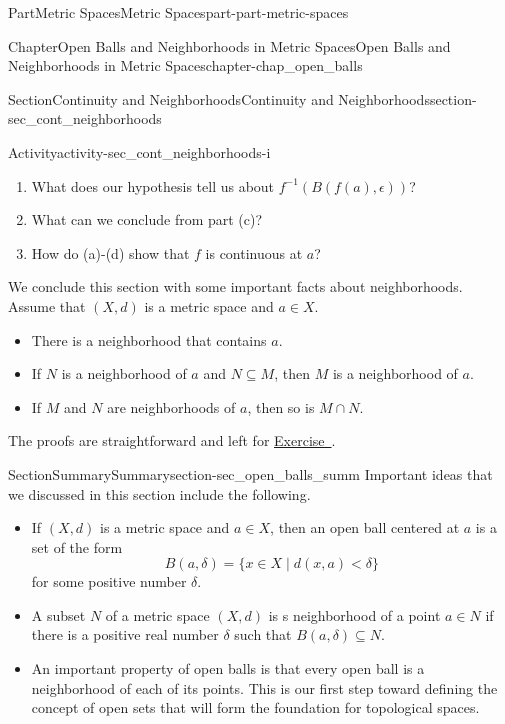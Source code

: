 \documentclass[oneside,10pt,]{book}
\newcommand{\xreffont}{\relax}
\numberwithin{equation}{chapter}
\newcommand{\lt}{<}
\begin{document}
\begin{partptx}{Part}{Metric Spaces}{}{Metric Spaces}{}{}{part-part-metric-spaces}
\begin{chapterptx}{Chapter}{Open Balls and Neighborhoods in Metric Spaces}{}{Open Balls and Neighborhoods in Metric Spaces}{}{}{chapter-chap_open_balls}
\begin{sectionptx}{Section}{Continuity and Neighborhoods}{}{Continuity and Neighborhoods}{}{}{section-sec_cont_neighborhoods}
\begin{activity}{Activity}{}{activity-sec_cont_neighborhoods-i}
\begin{enumerate}[font=\bfseries,label=(\alph*),ref=\alph*]
Suppose \(\epsilon\) is greater than 0, why is \(B(f(a), \epsilon)\) a neighborhood of \(f(a)\) in \(Y\)?%
\item{}What does our hypothesis tell us about \(f^{-1}\left(B(f(a), \epsilon)\right)\)?%
\item{}What can we conclude from part (c)?%
\item{}How do (a)-(d) show that \(f\) is continuous at \(a\)?%
\end{enumerate}%
\end{activity}%
We conclude this section with some important facts about neighborhoods. Assume that \((X,d)\) is a metric space and \(a \in X\).%
\begin{itemize}[label=\textbullet]
\item{}There is a neighborhood that contains \(a\).%
\item{}If \(N\) is a neighborhood of \(a\) and \(N \subseteq M\), then \(M\) is a neighborhood of \(a\).%
\item{}If \(M\) and \(N\) are neighborhoods of \(a\), then so is \(M \cap N\).%
\end{itemize}
%
\par
The proofs are straightforward and left for \hyperlink{exercise-ex_Nghb_properties}{Exercise~{\xreffont 8}}.%
\end{sectionptx}
%
%
\typeout{************************************************}
\typeout{************************************************}
%
\begin{sectionptx}{Section}{Summary}{}{Summary}{}{}{section-sec_open_balls_summ}
Important ideas that we discussed in this section include the following.%
\begin{itemize}[label=\textbullet]
\item{}If \((X,d)\) is a metric space and \(a \in X\), then an open ball centered at \(a\) is a set of the form%
\begin{equation*}
B(a,\delta) = \{ x \in X \mid d(x,a) \lt  \delta\}
\end{equation*}
for some positive number \(\delta\).%
\item{}A subset \(N\) of a metric space \((X,d)\) is s neighborhood of a point \(a \in N\) if there is a positive real number \(\delta\) such that \(B(a,\delta) \subseteq N\).%
\item{}An important property of open balls is that every open ball is a neighborhood of each of its points. This is our first step toward defining the concept of open sets that will form the foundation for topological spaces.%

\end{itemize}
\end{sectionptx}
\end{chapterptx}
\end{partptx}
\end{document}
